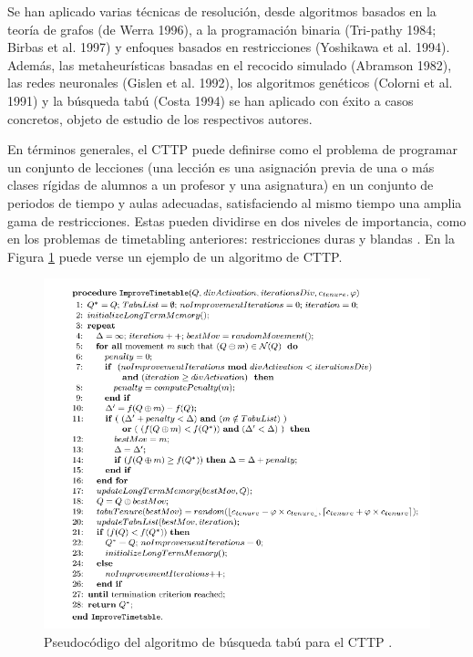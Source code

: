 Se han aplicado varias técnicas de resolución, desde
algoritmos basados en la teoría de grafos (de Werra 1996), a la programación binaria (Tri-pathy 1984; Birbas et al. 1997) y enfoques basados en restricciones (Yoshikawa et al. 1994). Además, las metaheurísticas basadas en el recocido simulado (Abramson 1982), las redes neuronales (Gislen et al. 1992), los algoritmos genéticos (Colorni et al. 1991) y la búsqueda tabú (Costa 1994) se han aplicado con éxito a casos concretos, objeto de estudio de los respectivos autores.\newline

En términos generales, el CTTP puede definirse como el problema de programar un conjunto de lecciones (una lección es una asignación previa de una o más clases rígidas de alumnos a un profesor y una asignatura) en un conjunto de periodos de tiempo y aulas adecuadas, satisfaciendo al mismo tiempo una amplia gama de restricciones. Estas pueden dividirse en dos niveles de importancia, como en los problemas de timetabling anteriores: restricciones duras y blandas \cite{carter}. En la Figura \ref{fig:CTTP} puede verse un ejemplo de un algoritmo de CTTP.

\begin{figure}[H]
    \centering
    \includegraphics[width=1\textwidth]{./imagenes/CTTP.png}
    \caption{Pseudocódigo del algoritmo de búsqueda tabú para el CTTP \cite{tabuSearch}.}
    \label{fig:CTTP}
\end{figure}



